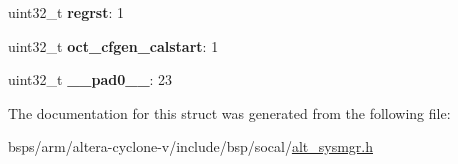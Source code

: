 \begin{DoxyCompactItemize}
uint32\+\_\+t {\bfseries regrst}\+: 1
\item 
\mbox{\label{structALT__SYSMGR__FRZCTL__HIOCTL__s_aa6de046d98a35226676168999b5ffb6e}} 
uint32\+\_\+t {\bfseries oct\+\_\+cfgen\+\_\+calstart}\+: 1
\item 
\mbox{\label{structALT__SYSMGR__FRZCTL__HIOCTL__s_a20294e4b6e22667f636f80294d324242}} 
uint32\+\_\+t {\bfseries \+\_\+\+\_\+pad0\+\_\+\+\_\+}\+: 23
\end{DoxyCompactItemize}


The documentation for this struct was generated from the following file\+:\begin{DoxyCompactItemize}
\item 
bsps/arm/altera-\/cyclone-\/v/include/bsp/socal/\mbox{\hyperlink{alt__sysmgr_8h}{alt\+\_\+sysmgr.\+h}}\end{DoxyCompactItemize}
